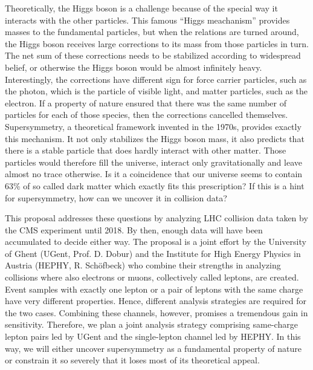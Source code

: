 \documentclass[11pt,a4paper]{article}
\begin{document}
Theoretically, the Higgs boson is a challenge because of the special way it interacts with the other particles. 
This famous ``Higgs meachanism'' provides masses to the fundamental particles, 
but when the relations are turned around, the Higgs boson receives large corrections to its mass from those particles in turn. 
The net sum of these corrections needs to be 
stabilized according to widespread belief, or otherwise the Higgs boson would be almost infinitely heavy. 
Interestingly, the corrections have different sign for force carrier particles, such as the photon, which is the particle of visible light, and matter particles, such
as the electron. If a property of nature ensured that there was the same number of particles for each of those species, then the corrections cancelled themselves.
Supersymmetry, a theoretical framework invented in the 1970s, provides exactly this mechanism. 
It not only stabilizes the Higgs boson mass, it also predicts that there is a stable particle
that does hardly interact with other matter. 
Those particles would therefore fill the universe, interact only gravitationally and leave almost no trace otherwise. Is it a coincidence 
that our universe seems to contain 63\% of so called dark matter which exactly fits this prescription? 
If this is a hint for supersymmetry, how can we uncover it in collision data? 

This proposal addresses these questions by analyzing LHC collision data taken by the CMS experiment until 2018. By then, enough data will have been accumulated to decide either way.
The proposal is a joint effort by the University of Ghent (UGent, Prof. D. Dobur) and the Institute for High Energy Physics in Austria (HEPHY, R. Sch\"ofbeck) who combine their strengths in analyzing
collisions where also electrons or muons, collectively called leptons, are created. 
Event samples with exactly one lepton or a pair of leptons with the same charge have very different properties. Hence, different analysis strategies are required for the two cases.
Combining these channels, however, promises a tremendous gain in sensitivity. Therefore, we plan a joint analysis strategy comprising same-charge lepton pairs led by UGent
and the single-lepton channel led by HEPHY. In this way, we will either uncover supersymmetry as a fundamental property of nature or constrain it so severely that it loses most of its theoretical appeal.
\end{document}
